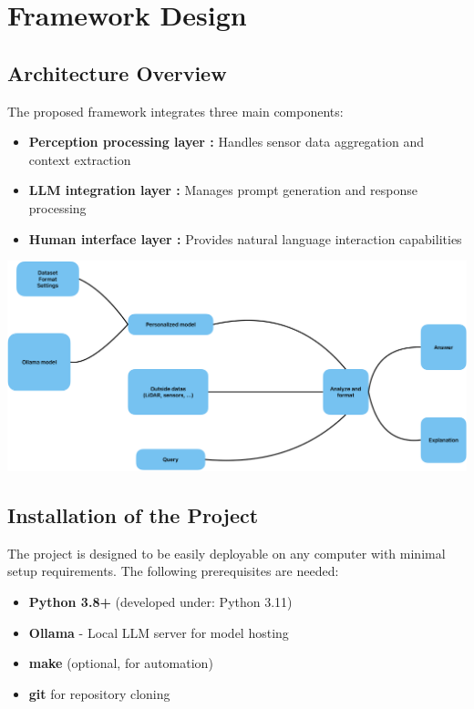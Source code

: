 \section{Framework Design}

\subsection{Architecture Overview}

The proposed framework integrates three main components:
\begin{itemize}
    \item \textbf{Perception processing layer :} Handles sensor data aggregation and context extraction
    \item \textbf{LLM integration layer :} Manages prompt generation and response processing
    \item \textbf{Human interface layer :} Provides natural language interaction capabilities
\end{itemize}

\begin{center}
    \includegraphics[scale=0.45]{figures/Model-HCI.png}
\end{center}

\subsection{Installation of the Project}

The project is designed to be easily deployable on any computer with minimal setup requirements.
The following prerequisites are needed:

\begin{itemize}
    \item \textbf{Python 3.8+} (developed under: Python 3.11)
    \item \textbf{Ollama} - Local LLM server for model hosting
    \item \textbf{make} (optional, for automation)
    \item \textbf{git} for repository cloning
\end{itemize}

